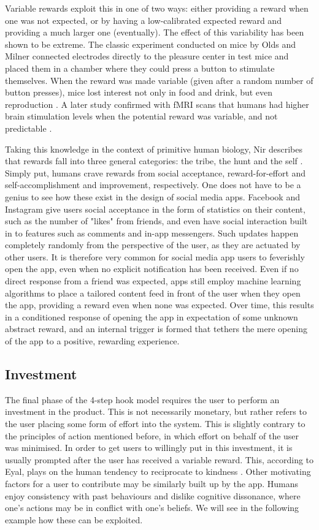 Variable rewards exploit this in one of two ways: either providing a reward when one was not expected, or by having a low-calibrated expected reward and providing a much larger one (eventually). The effect of this variability has been shown to be extreme. The classic experiment conducted on mice by Olds and Milner connected electrodes directly to the pleasure center in test mice and placed them in a chamber where they could press a button to stimulate themselves. When the reward was made variable (given after a random number of button presses), mice lost interest not only in food and drink, but even reproduction \cite{olds1954positive}. A later study confirmed with fMRI scans that humans had higher brain stimulation levels when the potential reward was variable, and not predictable \cite{berns2001predictability}.

Taking this knowledge in the context of primitive human biology, Nir describes that rewards fall into three general categories: the tribe, the hunt and the self \cite{eyal2014hooked}. Simply put, humans crave rewards from social acceptance, reward-for-effort and self-accomplishment and improvement, respectively. One does not have to be a genius to see how these exist in the design of social media apps. Facebook and Instagram give users social acceptance in the form of statistics on their content, such as the number of "likes" from friends, and even have social interaction built in to features such as comments and in-app messengers. Such updates happen completely randomly from the perspective of the user, as they are actuated by other users. It is therefore very common for social media app users to feverishly open the app, even when no explicit notification has been received. Even if no direct response from a friend was expected, apps still employ machine learning algorithms to place a tailored content feed in front of the user when they open the app, providing a reward even when none was expected. Over time, this results in a conditioned response of opening the app in expectation of some unknown abstract reward, and an internal trigger is formed that tethers the mere opening of the app to a positive, rewarding experience.

\subsection{Investment}
The final phase of the 4-step hook model requires the user to perform an investment in the product. This is not necessarily monetary, but rather refers to the user placing some form of effort into the system. This is slightly contrary to the principles of action mentioned before, in which effort on behalf of the user was minimised. In order to get users to willingly put in this investment, it is usually prompted after the user has received a variable reward. This, according to Eyal, plays on the human tendency to reciprocate to kindness \cite{eyal2014hooked}. Other motivating factors for a user to contribute may be similarly built up by the app. Humans enjoy consistency with past behaviours and dislike cognitive dissonance, where one's actions may be in conflict with one's beliefs. We will see in the following example how these can be exploited.

